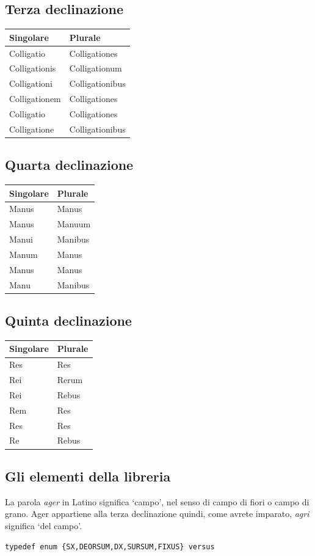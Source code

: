 \documentclass[8pt]{book}
\begin{document}
\subsection{Terza declinazione}
\begin{longtable}[c]{@{}ll@{}}
\toprule
Singolare & Plurale\tabularnewline
\midrule
\endhead
Colligatio & Colligationes\tabularnewline
Colligationis & Colligationum\tabularnewline
Colligationi & Colligationibus\tabularnewline
Colligationem & Colligationes\tabularnewline
Colligatio & Colligationes\tabularnewline
Colligatione & Colligationibus\tabularnewline
\bottomrule
\end{longtable}

\subsection{Quarta declinazione}
\begin{longtable}[c]{@{}ll@{}}
\toprule
Singolare & Plurale\tabularnewline
\midrule
\endhead
Manus & Manus\tabularnewline
Manus & Manuum\tabularnewline
Manui & Manibus\tabularnewline
Manum & Manus\tabularnewline
Manus & Manus\tabularnewline
Manu & Manibus\tabularnewline
\bottomrule
\end{longtable}

\subsection{Quinta declinazione}
\begin{longtable}[c]{@{}ll@{}}
\toprule
Singolare & Plurale\tabularnewline
\midrule
\endhead
Res & Res\tabularnewline
Rei & Rerum\tabularnewline
Rei & Rebus\tabularnewline
Rem & Res\tabularnewline
Res & Res\tabularnewline
Re & Rebus\tabularnewline
\bottomrule
\end{longtable}

\subsection{Gli elementi della libreria}

La parola \emph{ager} in Latino significa `campo', nel senso di campo di fiori o campo di grano. Ager appartiene alla terza declinazione quindi, come avrete imparato, \emph{agri} significa `del campo'.

\begin{spacing}{0.9}
  \begin{small}
    \begin{tcolorbox}
\begin{verbatim}
typedef enum {SX,DEORSUM,DX,SURSUM,FIXUS} versus
\end{verbatim}
  \end{tcolorbox}
    \end{small}
      \end{spacing}
\end{document}
